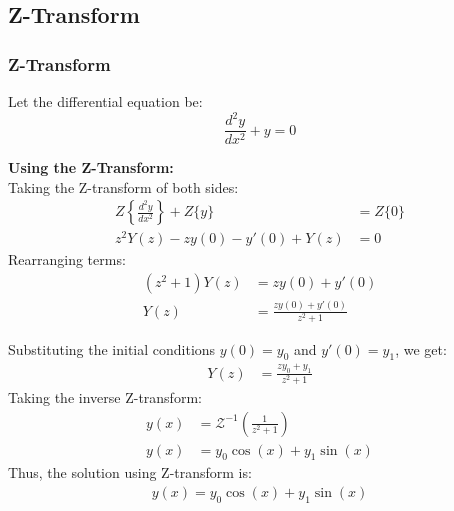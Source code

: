 \documentclass{beamer}
\theoremstyle{remark}
\numberwithin{equation}{section}
\begin{document}
	\subsection{Z-Transform}
	\begin{frame}[allowframebreaks]
		\frametitle{Z-Transform}
		Let the differential equation be:
		\[
		\frac{d^2y}{dx^2} + y = 0
		\]
		
		\textbf{Using the Z-Transform:}\\
		Taking the Z-transform of both sides:
		\begin{align}
			Z\left\{\frac{d^2y}{dx^2}\right\} + Z\{y\} &= Z\{0\} \\
			z^2 Y(z) - z y(0) - y'(0) + Y(z) &= 0
		\end{align}
		Rearranging terms:
		\begin{align}
			(z^2 + 1) Y(z) &= z y(0) + y'(0) \\
			Y(z) &= \frac{z y(0) + y'(0)}{z^2 + 1}
		\end{align}
		
		Substituting the initial conditions \(y(0) = y_0\) and \(y'(0) = y_1\), we get:
		\begin{align}
			Y(z) &= \frac{z y_0 + y_1}{z^2 + 1}
		\end{align}
		Taking the inverse Z-transform:
		\begin{align}
			y(x) &= \mathcal{Z}^{-1}\left( \frac{1}{z^2 + 1} \right) \\
			y(x) &= y_0 \cos(x) + y_1 \sin(x)
		\end{align}
		Thus, the solution using Z-transform is:
		\begin{align}
			y(x) = y_0 \cos(x) + y_1 \sin(x)
		\end{align}
	\end{frame}

	
\end{document}
